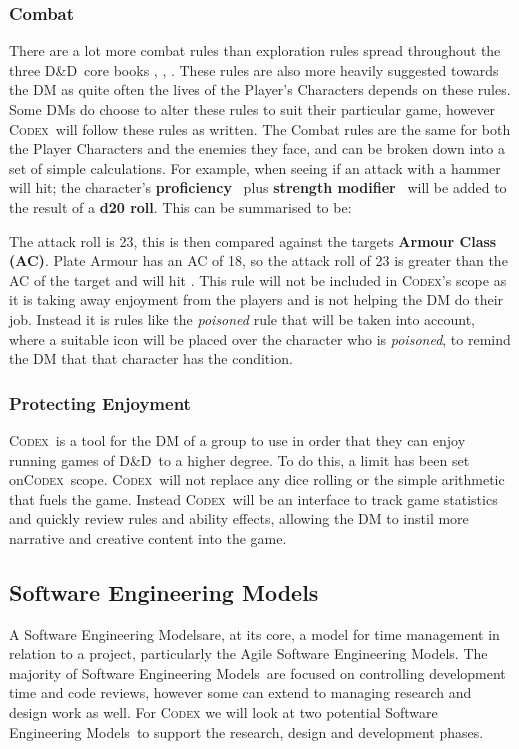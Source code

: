 \documentclass[review]{cmpreport}
\newcommand{\dnd}{D\&D}
\newcommand{\sems}{Software Engineering Models}
\newcommand{\Codex}{\textsc{Codex}}
\begin{document}
	\subsubsection{Combat}
	There are a lot more combat rules than exploration rules spread throughout the three \dnd \ core books \cite{DMGuide}, \cite{MonsterManual}, \cite{PlayerHandbook} . These rules are also more heavily suggested towards the DM as quite often the lives of the Player's Characters depends on these rules. Some DMs do choose to alter these rules to suit their particular game, however \Codex \ will follow these rules as written. The Combat rules are the same for both the Player Characters and the enemies they face, and can be broken down into a set of simple calculations. For example, when seeing if an attack with a hammer will hit; the character's \textbf{proficiency} \ plus \textbf{strength modifier} \ will be added to the result of a \textbf{d20 roll}. This can be summarised to be:

	The attack roll is 23, this is then compared against the targets \textbf{Armour Class (AC)}. Plate Armour has an AC of 18, so the attack roll of 23 is greater than the AC of the target and will hit \cite{PlayerHandbook}. This rule will not be included in \Codex's scope as it is taking away enjoyment from the players and is not helping the DM do their job. Instead it is rules like the \emph{poisoned} rule that will be taken into account, where a suitable icon will be placed over the character who is \emph{poisoned}, to remind the DM that that character has the condition.
	
	\subsubsection{Protecting Enjoyment}
	\Codex \ is a tool for the DM of a group to use in order that they can enjoy running games of \dnd \ to a higher degree. To do this, a limit has been set on\Codex \ scope. \Codex \ will not replace any dice rolling or the simple arithmetic that fuels the game. Instead \Codex \ will be an interface to track game statistics and quickly review rules and ability effects,  allowing the DM to instil more narrative and creative content into the game. 
	
	\subsection{Software Engineering Models}
	A \sems are, at its core, a model for time management in relation to a project, particularly the Agile \sems . The majority of \sems \ are focused on controlling development time and code reviews, however some can extend to managing research and design work as well. For \textsc{Codex} we will look at two potential \sems \ to support the research, design and development phases. 
	 
\end{document}
